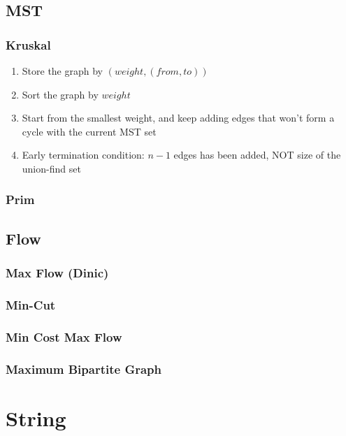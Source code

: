 \documentclass[10pt,oneside]{article}
\begin{document}
\begin{landscape}
\begin{multicols}{2}
\subsection{MST}

\subsubsection{Kruskal}

\begin{enumerate}
	\item Store the graph by $(weight, (from , to))$
	\item Sort the graph by $weight$ 
	\item Start from the smallest weight, and keep adding edges that won't form a cycle with the current MST set
	\item Early termination condition: $n - 1$ edges has been added, NOT size of the union-find set
\end{enumerate}

\subsubsection{Prim}

\subsection{Flow}

\subsubsection{Max Flow (Dinic)}

\subsubsection{Min-Cut}

\subsubsection{Min Cost Max Flow}

\subsubsection{Maximum Bipartite Graph}


\section{String}


\end{multicols}
\end{landscape}
\end{document}
